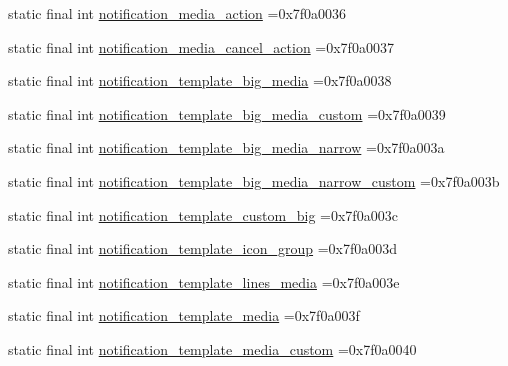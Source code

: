 \begin{DoxyCompactItemize}
static final int \mbox{\hyperlink{classcom_1_1example_1_1trainawearapplication_1_1_r_1_1layout_af2b69a79bc1943036cf5fed0cb403926}{notification\+\_\+media\+\_\+action}} =0x7f0a0036
\item 
static final int \mbox{\hyperlink{classcom_1_1example_1_1trainawearapplication_1_1_r_1_1layout_a07fd51d46bb2925c0b18e29171167ad3}{notification\+\_\+media\+\_\+cancel\+\_\+action}} =0x7f0a0037
\item 
static final int \mbox{\hyperlink{classcom_1_1example_1_1trainawearapplication_1_1_r_1_1layout_a52a08ef57d8c2095df10d45d4f8092e3}{notification\+\_\+template\+\_\+big\+\_\+media}} =0x7f0a0038
\item 
static final int \mbox{\hyperlink{classcom_1_1example_1_1trainawearapplication_1_1_r_1_1layout_a4ee801fe05669fdc4c228750079f0e53}{notification\+\_\+template\+\_\+big\+\_\+media\+\_\+custom}} =0x7f0a0039
\item 
static final int \mbox{\hyperlink{classcom_1_1example_1_1trainawearapplication_1_1_r_1_1layout_a88be24ae4da9b4f0ba63d8b37dfbd1a2}{notification\+\_\+template\+\_\+big\+\_\+media\+\_\+narrow}} =0x7f0a003a
\item 
static final int \mbox{\hyperlink{classcom_1_1example_1_1trainawearapplication_1_1_r_1_1layout_a30a01f806285b12e148fa5fb75e554c5}{notification\+\_\+template\+\_\+big\+\_\+media\+\_\+narrow\+\_\+custom}} =0x7f0a003b
\item 
static final int \mbox{\hyperlink{classcom_1_1example_1_1trainawearapplication_1_1_r_1_1layout_a791878258ff6db63aa65f490eef422af}{notification\+\_\+template\+\_\+custom\+\_\+big}} =0x7f0a003c
\item 
static final int \mbox{\hyperlink{classcom_1_1example_1_1trainawearapplication_1_1_r_1_1layout_af0a9bca6df4ad24ca2f4659dfe673b2d}{notification\+\_\+template\+\_\+icon\+\_\+group}} =0x7f0a003d
\item 
static final int \mbox{\hyperlink{classcom_1_1example_1_1trainawearapplication_1_1_r_1_1layout_aa9abc2dbf880e69366c0b50b1d0d646f}{notification\+\_\+template\+\_\+lines\+\_\+media}} =0x7f0a003e
\item 
static final int \mbox{\hyperlink{classcom_1_1example_1_1trainawearapplication_1_1_r_1_1layout_a2e7bf6d8dd7e59c0ca27f2eb433aa5e5}{notification\+\_\+template\+\_\+media}} =0x7f0a003f
\item 
static final int \mbox{\hyperlink{classcom_1_1example_1_1trainawearapplication_1_1_r_1_1layout_ac7d95444f31ea55a5b8274fbdf246308}{notification\+\_\+template\+\_\+media\+\_\+custom}} =0x7f0a0040

\end{DoxyCompactItemize}
